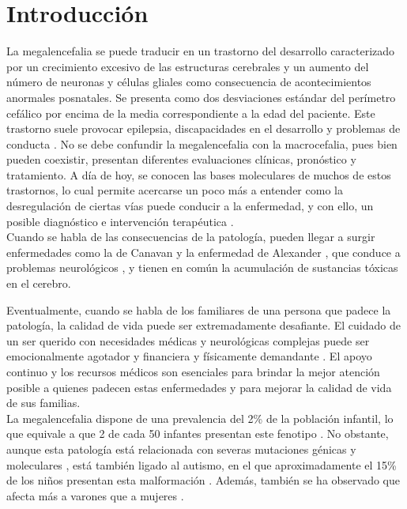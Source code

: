 \section{Introducción}

La megalencefalia se puede traducir en un trastorno del desarrollo caracterizado por un crecimiento excesivo de las estructuras cerebrales y un aumento del número de neuronas y células gliales como consecuencia de acontecimientos anormales posnatales. Se presenta como dos desviaciones estándar del perímetro cefálico por encima de la media correspondiente a la edad del paciente. Este trastorno suele provocar epilepsia, discapacidades en el desarrollo y problemas de conducta \cite{pavone_clinical_2017}.
No se debe confundir la megalencefalia con la macrocefalia, pues bien pueden coexistir, presentan diferentes evaluaciones clínicas, pronóstico y tratamiento. 
A día de hoy, se conocen las bases moleculares de muchos de estos trastornos, lo cual permite acercarse un poco más a entender como la desregulación de ciertas vías puede conducir a la enfermedad, y con ello, un posible diagnóstico e intervención terapéutica \cite{winden_megalencephaly_2015}. \\


Cuando se habla de las consecuencias de la patología, pueden llegar a surgir enfermedades como la de Canavan \cite{avellaneda_errores_2014} y la enfermedad de Alexander \cite{hagemann_alexander_2022}, que conduce a problemas neurológicos \cite{winden_megalencephaly_2015}, y tienen en común la acumulación de sustancias tóxicas en el cerebro.

Eventualmente, cuando se habla de los familiares de una persona que padece la patología, la calidad de vida puede ser extremadamente desafiante. El cuidado de un ser querido con necesidades médicas y neurológicas complejas puede ser emocionalmente agotador y financiera y físicamente demandante \cite{olivares_jimenez_ninos_2021}. El apoyo continuo y los recursos médicos son esenciales para brindar la mejor atención posible a quienes padecen estas enfermedades y para mejorar la calidad de vida de sus familias. \\


La megalencefalia dispone de una prevalencia del 2\% de la población infantil, lo que equivale a que 2 de cada 50 infantes presentan este fenotipo \cite{sandler_neurodevelopmental_1997}. No obstante, aunque esta patología está relacionada con severas mutaciones génicas y moleculares \cite{pavone_clinical_2017}, está también ligado al autismo, en el que aproximadamente el 15\% de los niños presentan esta malformación \cite{libero_persistence_2016}. Además, también se ha observado que afecta más a varones que a mujeres \cite{noauthor_megalencephaly_nodate}. \\



